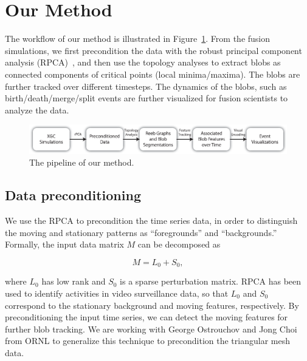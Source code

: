 \section{Our Method}
\label{sec:method}

The workflow of our method is illustrated in Figure~\ref{fig:pipeline}.  
From the fusion simulations, we first precondition the data with the robust principal component analysis (RPCA)~\cite{CandesLMW11}, and then use the topology analyses to extract blobs as connected components of critical points (local minima/maxima).  The blobs are further tracked over different timesteps.  The dynamics of the blobs, such as birth/death/merge/split events are further visualized for fusion scientists to analyze the data.  



\begin{figure}[!h]
  \centering
  \includegraphics[width=\linewidth]{Figs/pipeline}
  \caption{The pipeline of our method.}
  \label{fig:pipeline}
\end{figure}


\subsection{Data preconditioning}

We use the RPCA to precondition the time series data, in order to distinguish the moving and stationary patterns as ``foregrounds'' and ``backgrounds.''  Formally, the input data matrix $M$ can be decomposed as 

\begin{equation}
M = L_0 + S_0, 
\end{equation}

\noindent where $L_0$ has low rank and $S_0$ is a sparse perturbation matrix.  RPCA has been used to identify activities in video surveillance data, so that $L_0$ and $S_0$ correspond to the stationary background and moving features, respectively.  By preconditioning the input time series, we can detect the moving features for further blob tracking.  We are working with George Ostrouchov and Jong Choi from ORNL to generalize this technique to precondition the triangular mesh data.  


